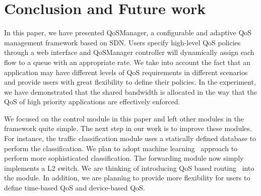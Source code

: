 \section{Conclusion and Future work}
\label{sect:future}

In this paper, we have presented QoSManager, a configurable and adaptive QoS management framework
based on SDN. Users specify high-level QoS policies through a web interface and QoSManager controller
will dynamically assign each flow to a queue with an appropriate rate. We take into account the fact
that an application may have different levels of QoS requirements in different scenarios and provide
users with great flexibility to define their policies. In the experiment, we have demonstrated that
the shared bandwidth is allocated in the way that the QoS of high priority applications are effectively
enforced.

We focused on the control module in this paper and left other modules in the framework quite simple.
The next step in our work is to improve these modules. For instance, the traffic classification module
uses a statically defined database to perform the classification. We plan to adopt machine learning~\cite{ml}
approach to perform more sophisticated classification. The forwarding module now simply implements a L2
switch. We are thinking of introducing QoS based routing~\cite{Apostolopoulos_SIGCOMM98} into the module. In addition, we
are planning to provide more flexibility for users to define time-based QoS and device-based QoS.
